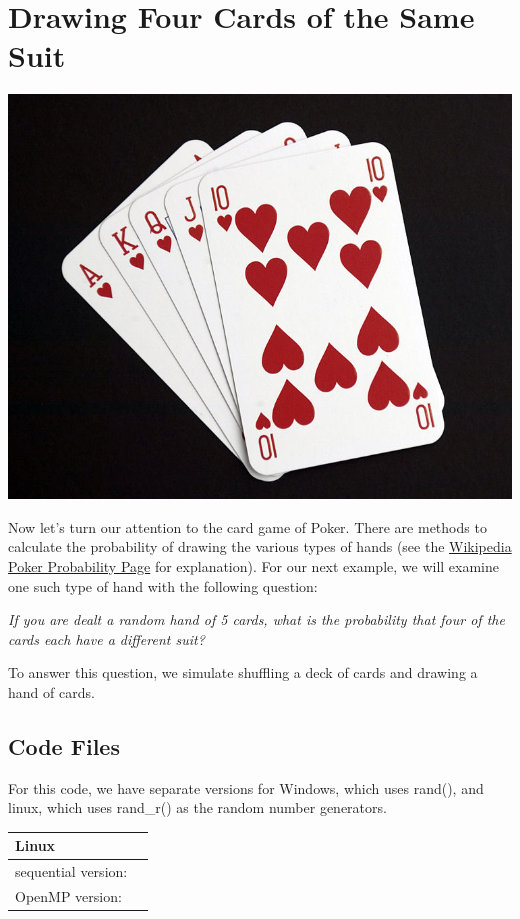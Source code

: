 \documentclass[letterpaper,10pt,openany,oneside]{sphinxmanual}
\begin{document}
\chapter{Drawing Four Cards of the Same Suit}
\label{DrawFourSuitsExample/DrawFourSuitsExample:drawing-four-cards-of-the-same-suit}\label{DrawFourSuitsExample/DrawFourSuitsExample::doc}
\includegraphics{RoyalFlush.jpg}

Now let's turn our attention to the card game of Poker.
There are methods to calculate the probability of drawing the various types of hands (see the \href{http://en.wikipedia.org/wiki/Poker\_probability}{Wikipedia Poker Probability Page} for explanation).
For our next example, we will examine one such type of hand with the following question:

\emph{If you are dealt a random hand of 5 cards, what is the probability that four of the cards each have a different
suit?}

To answer this question, we simulate shuffling a deck of cards and drawing a hand of cards.


\section{Code Files}
\label{DrawFourSuitsExample/DrawFourSuitsExample:code-files}
For this code, we have separate versions for Windows, which uses rand(), and linux, which uses rand\_r() as the random number generators.

\begin{tabulary}{\linewidth}{|L|L|}
\hline
\textbf{
Linux
} & \textbf{}\\\hline

sequential version:
 & 
\\\hline

OpenMP version:
 & 
\\\hline
\end{tabulary}
\end{document}
